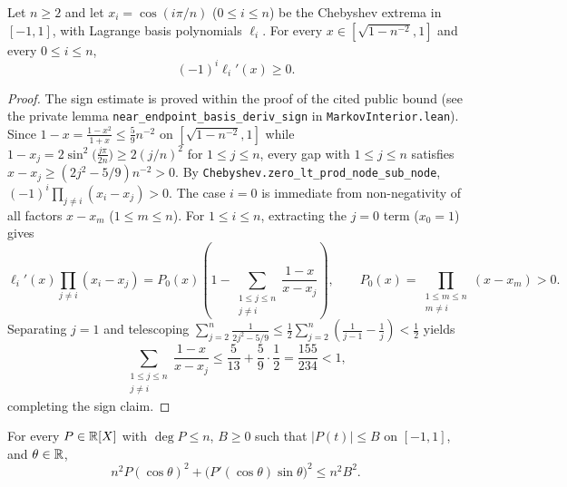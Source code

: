 \begin{lemma}
\label{lem:lagrange-near-endpoint}
\leanok
Let $n \ge 2$ and let $x_i = \cos(i\pi/n)$ ($0 \le i \le n$) be the Chebyshev extrema in $[-1, 1]$, with Lagrange basis polynomials $\ell_i$. For every $x \in [\sqrt{1 - n^{-2}}, 1]$ and every $0 \le i \le n$,
\[
(-1)^i \ell_i'(x) \ge 0.
\]
\end{lemma}

\begin{proof}
The sign estimate is proved within the proof of the cited public bound (see the private lemma \texttt{near\_endpoint\_basis\_deriv\_sign} in \texttt{MarkovInterior.lean}). Since $1 - x = \frac{1 - x^2}{1 + x} \le \frac{5}{9} n^{-2}$ on $[\sqrt{1 - n^{-2}}, 1]$ while $1 - x_j = 2\sin^2\!\bigl(\frac{j\pi}{2n}\bigr) \ge 2(j/n)^2$ for $1 \le j \le n$, every gap with $1 \le j \le n$ satisfies $x - x_j \ge (2j^2 - 5/9)n^{-2} > 0$. By \texttt{Chebyshev.zero\_lt\_prod\_node\_sub\_node}, $(-1)^i \prod_{j \ne i}(x_i - x_j) > 0$. The case $i = 0$ is immediate from non-negativity of all factors $x - x_m$ ($1 \le m \le n$). For $1 \le i \le n$, extracting the $j = 0$ term ($x_0 = 1$) gives
\[
\ell_i'(x) \prod_{j \ne i}(x_i - x_j)
= P_0(x)\!\left(1 - \sum_{\substack{1 \le j \le n \\ j \ne i}} \frac{1 - x}{x - x_j}\right),
\qquad P_0(x) = \prod_{\substack{1 \le m \le n \\ m \ne i}} (x - x_m) > 0.
\]
Separating $j = 1$ and telescoping $\sum_{j=2}^n \frac{1}{2j^2 - 5/9} \le \frac{1}{2}\sum_{j=2}^n \left(\frac{1}{j-1} - \frac{1}{j}\right) < \frac{1}{2}$ yields
\[
\sum_{\substack{1 \le j \le n \\ j \ne i}} \frac{1 - x}{x - x_j}
\le \frac{5}{13} + \frac{5}{9}\cdot \frac{1}{2} = \frac{155}{234} < 1,
\]
completing the sign claim.
\end{proof}

\begin{theorem}
\label{thm:vandercorput-schaake}
\leanok
For every $P \in \mathbb{R}[X]$ with $\deg P \le n$, $B \ge 0$ such that $|P(t)| \le B$ on $[-1, 1]$, and $\theta \in \mathbb{R}$,
\[
n^2 P(\cos\theta)^2 + \bigl(P'(\cos\theta)\sin\theta\bigr)^2 \le n^2 B^2.
\]
\end{theorem}


